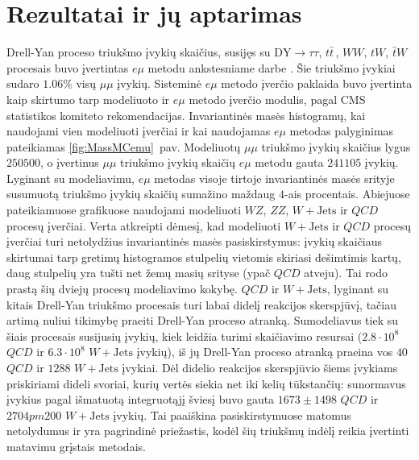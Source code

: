 \documentclass[a4paper, 12pt, oneside]{article}
\newcommand{\ZZ}{Z\! Z}
\newcommand{\WZ}{W\! Z}
\newcommand{\emu}{e\mu}
\newcommand{\WJets}{W\! +\!\mathrm{Jets}}
\newcommand{\DYtau}{\mathrm{DY} \! \rightarrow \! \tau\tau}
\newcommand{\QCD}{QC\! D}
\begin{document}
\section{Rezultatai ir jų aptarimas}
Drell-Yan proceso triukšmo įvykių skaičius, susijęs su $\DYtau$, $t\bar{t}\,$, $WW$, $tW$, $\bar{t}W$ procesais buvo įvertintas
$\emu$ metodu ankstesniame darbe \cite{MAk2}.
Šie triukšmo įvykiai sudaro $1.06\%$ visų $\mu\mu$ įvykių.
Sisteminė $\emu$ metodo įverčio paklaida buvo įvertinta kaip skirtumo tarp modeliuoto ir $\emu$ metodo įverčio modulis, pagal
CMS statistikos komiteto rekomendacijas.
Invariantinės masės histogramų, kai naudojami vien modeliuoti įverčiai ir kai naudojamas $\emu$ metodas palyginimas pateikiamas
\ref{fig:MassMCemu}~pav.
Modeliuotų $\mu\mu$ triukšmo įvykių skaičius lygus $250500$, o įvertinus $\mu\mu$ triukšmo įvykių skaičių  $e\mu$ metodu
gauta $241105$ įvykių.
Lyginant su modeliavimu, $\emu$ metodas visoje tirtoje invariantinės masės srityje susumuotą triukšmo įvykių skaičių
sumažino maždaug $4$-ais procentais.
Abiejuose pateikiamuose grafikuose naudojami modeliuoti $\WZ$, $\ZZ$, $\WJets$ ir $\QCD$ procesų įverčiai.
Verta atkreipti dėmesį, kad modeliuoti $\WJets$ ir $\QCD$ procesų įverčiai turi netolydžius invariantinės masės pasiskirstymus:
įvykių skaičiaus skirtumai tarp gretimų histogramos stulpelių vietomis skiriasi dešimtimis kartų, daug stulpelių yra tušti
net žemų masių srityse (ypač $\QCD$ atveju).
Tai rodo prastą šių dviejų procesų modeliavimo kokybę.
$\QCD$ ir $\WJets$, lyginant su kitais Drell-Yan triukšmo procesais turi labai didelį reakcijos skerspjūvį, tačiau artimą
nuliui tikimybę praeiti Drell-Yan proceso atranką.
Sumodeliavus tiek su šiais procesais susijusių įvykių, kiek leidžia turimi skaičiavimo resursai ($2.8\cdot10^8$ $\QCD$ ir
$6.3\cdot10^8$ $\WJets$ įvykių), iš jų Drell-Yan proceso atranką praeina vos $40$ $\QCD$ ir $1288$ $\WJets$ įvykiai.
Dėl didelio reakcijos skerspjūvio šiems įvykiams priskiriami dideli svoriai, kurių vertės siekia net iki kelių tūkstančių:
sunormavus įvykius pagal išmatuotą integruotąjį šviesį buvo gauta $1673\pm1498$ $\QCD$ ir $2704pm200$ $\WJets$ įvykių. 
Tai paaiškina pasiskirstymuose matomus netolydumus ir yra pagrindinė priežastis, kodėl šių triukšmų indėlį reikia įvertinti
matavimu grįstais metodais.
\end{document}
